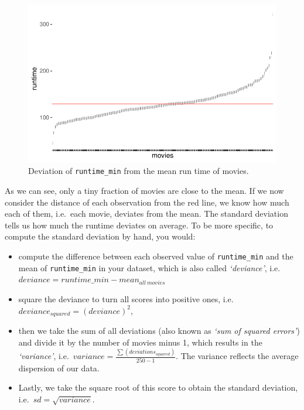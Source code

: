 \documentclass[
  letterpaper,
]{krantz}
\begin{document}
\begin{figure}[H]

{\centering \includegraphics{08_descriptive_statistics_files/figure-pdf/runtime-movies-deviation-1.pdf}

}

\caption{Deviation of \texttt{runtime\_min} from the mean run time of
movies.}

\end{figure}%

As we can see, only a tiny fraction of movies are close to the mean. If
we now consider the distance of each observation from the red line, we
know how much each of them, i.e.~each movie, deviates from the mean. The
standard deviation tells us how much the runtime deviates on average. To
be more specific, to compute the standard deviation by hand, you would:

\begin{itemize}
\item
  compute the difference between each observed value of
  \texttt{runtime\_min} and the mean of \texttt{runtime\_min} in your
  dataset, which is also called \emph{`deviance'},
  i.e.~\(deviance = runtime\_min - mean_{all\ movies}\)
\item
  square the deviance to turn all scores into positive ones,
  i.e.~\(deviance_{squared} = (deviance)^2\),
\item
  then we take the sum of all deviations (also known as \emph{`sum of
  squared errors'}) and divide it by the number of movies minus 1, which
  results in the \emph{`variance'},
  i.e.~\(variance = \frac{\sum(deviations_{squared})}{250-1}\). The
  variance reflects the average dispersion of our data.
\item
  Lastly, we take the square root of this score to obtain the standard
  deviation, i.e.~\(sd = \sqrt{variance}\).
\end{itemize}
\end{document}
